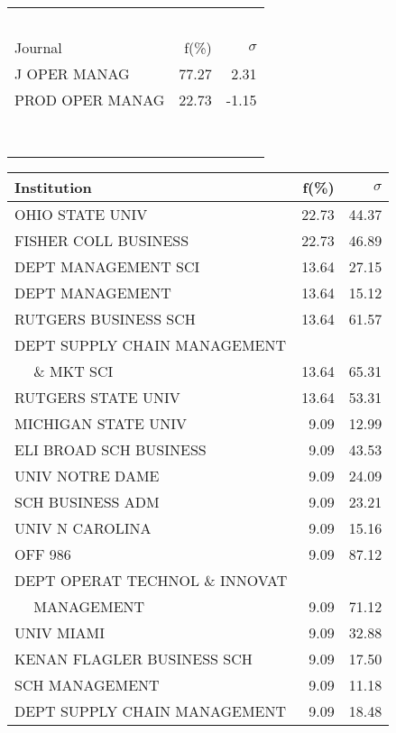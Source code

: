 \documentclass[a4paper,11pt]{report}
\begin{document}
\begin{landscape}
\begin{table}[!ht]
{\begin{tabular}{|l r  r|}
 &  & \\
 &  & \\
 &  & \\
 &  & \\
 &  & \\
\hline
\hline
Journal & f(\%) & $\sigma$\\
\hline
J OPER MANAG & 77.27 & 2.31\\
PROD OPER MANAG & 22.73 & -1.15\\
 &  & \\
 &  & \\
 &  & \\
 &  & \\
 &  & \\
 &  & \\
 &  & \\
 &  & \\
\hline
\end{tabular}
}
{\scriptsize\begin{tabular}{|l r r|}
\hline
Institution & f(\%) & $\sigma$\\
\hline
OHIO STATE UNIV & 22.73 & 44.37\\
FISHER COLL BUSINESS & 22.73 & 46.89\\
DEPT MANAGEMENT SCI & 13.64 & 27.15\\
DEPT MANAGEMENT & 13.64 & 15.12\\
RUTGERS BUSINESS SCH & 13.64 & 61.57\\
DEPT SUPPLY CHAIN MANAGEMENT &  & \\
$\quad$ \& MKT SCI & 13.64 & 65.31\\
RUTGERS STATE UNIV & 13.64 & 53.31\\
MICHIGAN STATE UNIV & 9.09 & 12.99\\
ELI BROAD SCH BUSINESS & 9.09 & 43.53\\
UNIV NOTRE DAME & 9.09 & 24.09\\
SCH BUSINESS ADM & 9.09 & 23.21\\
UNIV N CAROLINA & 9.09 & 15.16\\
OFF 986 & 9.09 & 87.12\\
DEPT OPERAT TECHNOL \& INNOVAT &  & \\
$\quad$ MANAGEMENT & 9.09 & 71.12\\
UNIV MIAMI & 9.09 & 32.88\\
KENAN FLAGLER BUSINESS SCH & 9.09 & 17.50\\
SCH MANAGEMENT & 9.09 & 11.18\\
DEPT SUPPLY CHAIN MANAGEMENT & 9.09 & 18.48\\

\end{tabular}}
\end{table}
\end{landscape}
\end{document}
